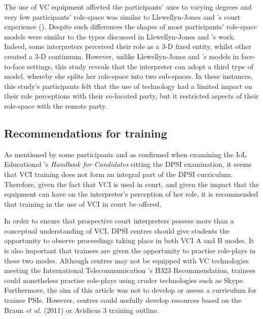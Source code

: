 \documentclass[output=paper]{langsci/langscibook}
\begin{document}
The use of VC equipment affected the participants’ axes to varying degrees and very few participants’ role-space was similar to Llewellyn-Jones and \citet{Lee2014}’s court experience (). Despite such differences the shapes of most participants’ role-space models were similar to the types discussed in Llewellyn-Jones and \citet{Lee2014}’s work. Indeed, some interpreters perceived their role as a 3-D fixed entity, whilst other created a 3-D continuum. However, unlike Llewellyn-Jones and \citet{Lee2014}’s models in face-to-face settings, this study reveals that the interpreter can adopt a third type of model, whereby she splits her role-space into two sub-spaces. In these instances, this study’s participants felt that the use of technology had a limited impact on their role perceptions with their co-located party, but it restricted aspects of their role-space with the remote party. 

\subsection{Recommendations for training}

As mentioned by some participants and as confirmed when examining the IoL Educational \citet{Trust2015}’s \textit{Handbook for Candidates} sitting the DPSI examination, it seems that VCI training does not form an integral part of the DPSI curriculum. Therefore, given the fact that VCI is used in court, and given the impact that the equipment can have on the interpreter’s perception of her role, it is recommended that training in the use of VCI in court be offered.  

In order to ensure that prospective court interpreters possess more than a conceptual understanding of VCI, DPSI centres should give students the opportunity to observe proceedings taking place in both VCI A and B modes. It is also important that trainees are given the opportunity to practise role-plays in these two modes. Although centres may not be equipped with VC technologies meeting the International Telecommunication \citet{Union2009}’s H323 Recommendation, trainees could nonetheless practise role-plays using cruder technologies such as Skype. Furthermore, the aim of this article was not to develop or assess a curriculum for trainee PSIs. However, centres could usefully develop resources based on the Braun \textit{et al.} (2011) or Avidicus 3 training outline. 
\end{document}
